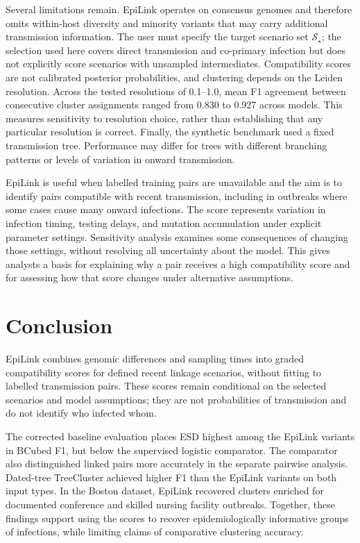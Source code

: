Several limitations remain. EpiLink operates on consensus genomes and therefore omits within-host diversity and minority variants that may carry additional transmission information. The user must specify the target scenario set $\mathcal{S}_\star$; the selection used here covers direct transmission and co-primary infection but does not explicitly score scenarios with unsampled intermediates. Compatibility scores are not calibrated posterior probabilities, and clustering depends on the Leiden resolution. Across the tested resolutions of 0.1--1.0, mean F1 agreement between consecutive cluster assignments ranged from 0.830 to 0.927 across models. This measures sensitivity to resolution choice, rather than establishing that any particular resolution is correct. Finally, the synthetic benchmark used a fixed transmission tree. Performance may differ for trees with different branching patterns or levels of variation in onward transmission.

EpiLink is useful when labelled training pairs are unavailable and the aim is to identify pairs compatible with recent transmission, including in outbreaks where some cases cause many onward infections. The score represents variation in infection timing, testing delays, and mutation accumulation under explicit parameter settings. Sensitivity analysis examines some consequences of changing those settings, without resolving all uncertainty about the model. This gives analysts a basis for explaining why a pair receives a high compatibility score and for assessing how that score changes under alternative assumptions.

\section{Conclusion}\label{sec:ch3_conclusions}

EpiLink combines genomic differences and sampling times into graded compatibility scores for defined recent linkage scenarios, without fitting to labelled transmission pairs. These scores remain conditional on the selected scenarios and model assumptions; they are not probabilities of transmission and do not identify who infected whom.

The corrected baseline evaluation places ESD highest among the EpiLink variants in BCubed F1, but below the supervised logistic comparator. The comparator also distinguished linked pairs more accurately in the separate pairwise analysis. Dated-tree TreeCluster achieved higher F1 than the EpiLink variants on both input types. In the Boston dataset, EpiLink recovered clusters enriched for documented conference and skilled nursing facility outbreaks. Together, these findings support using the scores to recover epidemiologically informative groups of infections, while limiting claims of comparative clustering accuracy.

